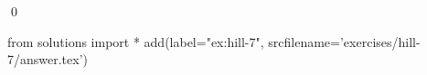 
\begin{ex} 
  \label{ex:hill-7}
  
  \qed
\end{ex} 
\begin{python0}
from solutions import *
add(label="ex:hill-7",
    srcfilename='exercises/hill-7/answer.tex') 
\end{python0}
